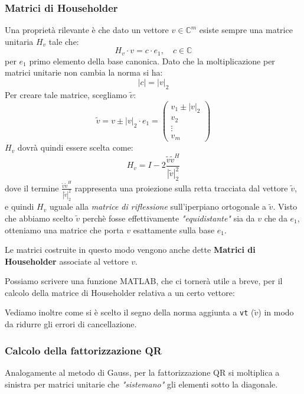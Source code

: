 \documentclass[a4paper,11pt]{article}
\begin{document}
\subsubsection{Matrici di Householder}
Una proprietà rilevante è che dato un vettore $v \in \mathbb{C}^m$ esiste sempre una matrice unitaria $H_v$ tale che:
$$
H_v \cdot v = c \cdot e_1, \quad c \in \mathbb{C}
$$
per $e_1$ primo elemento della base canonica.
Dato che la moltiplicazione per matrici unitarie non cambia la norma si ha:
$$
|c| = |v|_2
$$
Per creare tale matrice, scegliamo $\tilde{v}$:
$$
\tilde{v} = v \pm |v|_2 \cdot e_1 =
\begin{pmatrix}
	v_1 \pm |v|_2 \\ 
	v_2 \\ 
	\vdots \\ 
	v_m
\end{pmatrix}
$$
$H_v$ dovrà quindi essere scelta come:
$$
H_v = I - 2  \frac{\tilde{v} \tilde{v}^H}{|\tilde{v}|_2^2}
$$
dove il termine $\frac{\tilde{v} \tilde{v}^H}{|\tilde{v}|_2^2}$ rappresenta una proiezione sulla retta tracciata dal vettore $\tilde{v}$, e quindi $H_v$ uguale alla \textit{matrice di riflessione} sull'iperpiano ortogonale a $\tilde{v}$.   
Visto che abbiamo scelto $\tilde{v}$ perchè fosse effettivamente \textit{"equidistante"} sia da $v$ che da $e_1$, otteniamo una matrice che porta $v$ esattamente sulla base $e_1$.

Le matrici costruite in questo modo vengono anche dette \textbf{Matrici di Householder} associate al vettore $v$.

Possiamo scrivere una funzione MATLAB, che ci tornerà utile a breve, per il calcolo della matrice di Householder relativa a un certo vettore:
\lstset{language=MATLAB,style=codestyle}


Vediamo inoltre come si è scelto il segno della norma aggiunta a \lstinline|vt| ($\tilde{v}$) in modo da ridurre gli errori di cancellazione.

\subsubsection{Calcolo della fattorizzazione QR}
Analogamente al metodo di Gauss, per la fattorizzazione QR si moltiplica a sinistra per matrici unitarie che \textit{"sistemano"} gli elementi sotto la diagonale.
\end{document}
